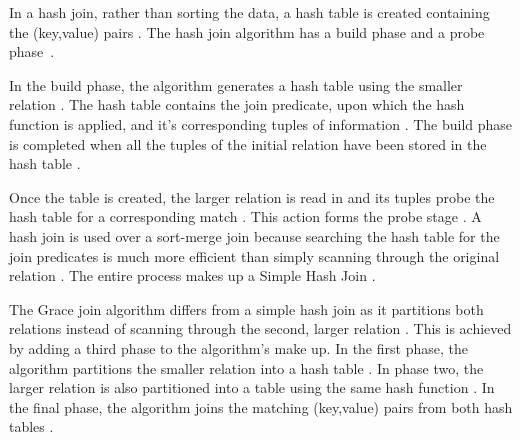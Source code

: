 \documentclass[11pt,twocolumn]{witseiepaper}
\begin{document}
In a hash join, rather than sorting the data, a hash table is created containing the (key,value) pairs \cite{thomas_zurek_optimisation_1997}. The hash join algorithm has a build phase and a probe phase~\cite{equijoin}. 

In the build phase, the algorithm generates a hash table using the smaller relation \cite{evaluating4JoinAlgorithms}. The hash table contains the join predicate, upon which the hash function is applied, and it's corresponding tuples of information \cite{thomas_zurek_optimisation_1997, evaluating4JoinAlgorithms}. The build phase is completed when all the tuples of the initial relation have been stored in the hash table \cite{thomas_zurek_optimisation_1997}. 

Once the table is created, the larger relation is read in and its tuples probe the hash table for a corresponding match \cite{thomas_zurek_optimisation_1997}. This action forms the probe stage \cite{evaluating4JoinAlgorithms}. A hash join is used over a sort-merge join because searching the hash table for the join predicates is much more efficient than simply scanning through the original relation \cite{evaluating4JoinAlgorithms}. The entire process makes up a Simple Hash Join \cite{evaluating4JoinAlgorithms}. 

The Grace join algorithm differs from a simple hash join as it partitions both relations instead of scanning through the second, larger relation \cite{graceHash}. This is achieved by adding a third phase to the algorithm's make up. In the first phase, the algorithm partitions the smaller relation into a hash table \cite{graceHash}. In phase two, the larger relation is also partitioned into a table using the same hash function \cite{evaluating4JoinAlgorithms}. In the final phase, the algorithm joins the matching (key,value) pairs from both hash tables \cite{evaluating4JoinAlgorithms}.
\end{document}
